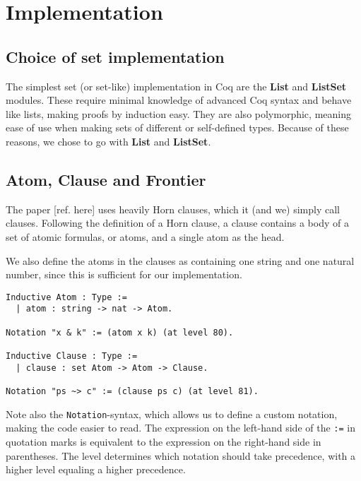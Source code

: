 \chapter{Implementation}

\section{Choice of set implementation}

The simplest set (or set-like) implementation in Coq are the \textbf{List} and \textbf{ListSet} modules.
These require minimal knowledge of advanced Coq syntax and behave like lists, making proofs by induction easy.
They are also polymorphic, meaning ease of use when making sets of different or self-defined types.
Because of these reasons, we chose to go with \textbf{List} and \textbf{ListSet}.

\newpage

\section{Atom, Clause and Frontier}

The paper [ref. here] uses heavily Horn clauses, which it (and we) simply call clauses.
Following the definition of a Horn clause, a clause contains a body of a set of atomic formulas,
or atoms, and a single atom as the head.

We also define the atoms in the clauses as containing one string and one natural number,
since this is sufficient for our implementation.

\begin{lstlisting}[language=Coq, label={lst:atom_clause_def}, caption={Def. of \lstinline{Atom} and \lstinline{Clause} in Coq}]
Inductive Atom : Type :=
  | atom : string -> nat -> Atom.

Notation "x & k" := (atom x k) (at level 80).

Inductive Clause : Type :=
  | clause : set Atom -> Atom -> Clause.

Notation "ps ~> c" := (clause ps c) (at level 81).
\end{lstlisting}

Note also the \lstinline{Notation}-syntax, which allows us to define a custom notation,
making the code easier to read. The expression on the left-hand side of the \lstinline{:=} in quotation marks
is equivalent to the expression on the right-hand side in parentheses.
The level determines which notation should take precedence, with a higher level equaling a higher precedence.

